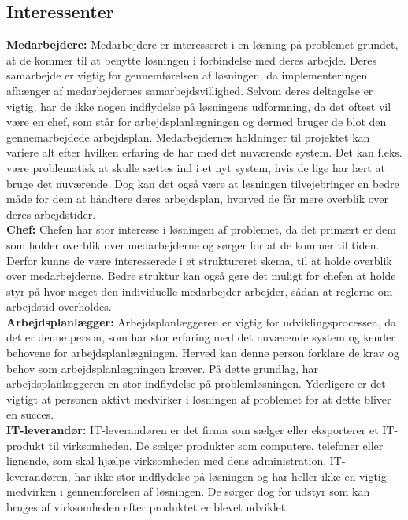 \subsection{Interessenter}
\textbf{Medarbejdere:}
Medarbejdere er interesseret i en løsning på problemet grundet, at de kommer til at benytte løsningen i forbindelse med deres arbejde. Deres samarbejde er vigtig for gennemførelsen af løsningen, da implementeringen afhænger af medarbejdernes samarbejdsvillighed. Selvom deres deltagelse er vigtig, har de ikke nogen indflydelse på løsningens udformning, da det oftest vil være en chef, som står for arbejdsplanlægningen og dermed bruger de blot den gennemarbejdede arbejdsplan. Medarbejdernes holdninger til projektet kan variere alt efter hvilken erfaring de har med det nuværende system. Det kan f.eks. være problematisk at skulle sættes ind i et nyt system, hvis de lige har lært at bruge det nuværende. Dog kan det også være at løsningen tilvejebringer en bedre måde for dem at håndtere deres arbejdsplan, hvorved de får mere overblik over deres arbejdstider.\\

\textbf{Chef:}
Chefen har stor interesse i løsningen af problemet, da det primært er dem som holder overblik over medarbejderne og sørger for at de kommer til tiden. Derfor kunne de være interesserede i et struktureret skema, til at holde overblik over medarbejderne. Bedre struktur kan også gøre det muligt for chefen at holde styr på hvor meget den individuelle medarbejder arbejder, sådan at reglerne om arbejdstid overholdes.\\

\textbf{Arbejdsplanlægger:}
Arbejdsplanlæggeren er vigtig for udviklingsprocessen, da det er denne person, som har stor erfaring med det nuværende system og kender behovene for arbejdsplanlægningen. Herved kan denne person forklare de krav og behov som arbejdsplanlægningen kræver. På dette grundlag, har arbejdsplanlæggeren en stor indflydelse på problemløsningen. Yderligere er det vigtigt at personen aktivt medvirker i løsningen af problemet for at dette bliver en succes. \\

\textbf{IT-leverandør:}
IT-leverandøren er det firma som sælger eller eksporterer et IT-produkt til virksomheden. De sælger produkter som computere, telefoner eller lignende, som skal hjælpe virksomheden med dens administration.
IT-leverandøren, har ikke stor indflydelse på løsningen og har heller ikke en vigtig medvirken i gennemførelsen af løsningen. De sørger dog for udstyr som kan bruges af virksomheden efter produktet er blevet udviklet.\\

